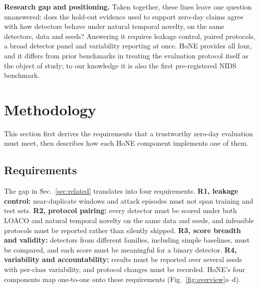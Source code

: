 \documentclass[conference]{IEEEtran}
\newif\ifappendix
\begin{document}
\textbf{Research gap and positioning.} Taken together, these lines leave one question unanswered: does the hold-out evidence used to support zero-day claims agree with how detectors behave under natural temporal novelty, on the same detectors, data and seeds? Answering it requires leakage control, paired protocols, a broad detector panel and variability reporting at once. HoNE provides all four, and it differs from prior benchmarks in treating the evaluation protocol itself as the object of study; to our knowledge it is also the first pre-registered NIDS benchmark.\ifappendix\ Appendix~\ref{app:related} extends this review to sequence, neuromorphic and drift-aware NIDS and positions HoNE against prior work in Table~\ref{tab:pos}.\fi

\section{Methodology}
\label{sec:method}
This section first derives the requirements that a trustworthy zero-day evaluation must meet, then describes how each HoNE component implements one of them.

\subsection{Requirements}
The gap in Sec.~\ref{sec:related} translates into four requirements. \textbf{R1, leakage control:} near-duplicate windows and attack episodes must not span training and test sets. \textbf{R2, protocol pairing:} every detector must be scored under both LOACO and natural temporal novelty on the same data and seeds, and infeasible protocols must be reported rather than silently skipped. \textbf{R3, score breadth and validity:} detectors from different families, including simple baselines, must be compared, and each score must be meaningful for a binary detector. \textbf{R4, variability and accountability:} results must be reported over several seeds with per-class variability, and protocol changes must be recorded. HoNE's four components map one-to-one onto these requirements (Fig.~\ref{fig:overview}a--d).
\end{document}
